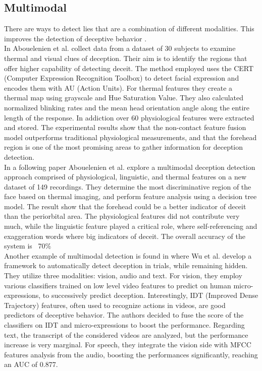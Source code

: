 \documentclass[LaM,binding=0.6cm,english,noexaminfo]{sapthesis}
\begin{document}
\subsection*{Multimodal}
There are ways to detect lies that are a combination of different modalities. This improves the detection of deceptive behavior \cite{Abouelenien:2014:DDU:2663204.2663229}. \\
In \cite{Abouelenien:2016:ATV:2910674.2910682} Abouelenien et al. collect data from a dataset of 30 subjects to examine thermal and visual clues of deception. Their aim is to identify the regions that offer higher capability of detecting deceit. The method employed uses the CERT (Computer Expression Recognition Toolbox) to detect facial expression and encodes them with AU (Action Units). For thermal features they create a thermal map using grayscale and Hue Saturation Value. They also calculated normalized blinking rates and the mean head orientation angle along the entire length of the response. In addiction over 60 physiological features were extracted and stored. The experimental results show that the non-contact feature fusion model outperforms traditional physiological measurements, and that the forehead region is one of the most promising areas to gather information for deception detection.\\
In a following paper \cite{7782429} Abouelenien et al. explore a multimodal deception detection approach comprised of physiological, linguistic, and thermal features on a new dataset of 149 recordings. They determine the most discriminative region of the face based on thermal imaging, and perform feature analysis using a decision tree model. The result show that the forehead could be a better indicator of deceit than the periorbital area. The physiological features did not contribute very much, while the linguistic feature played a critical role, where self-referencing and exaggeration words where big indicators of deceit. The overall accuracy of the system is ~70\%\\
Another example of multimodal detection is found in \cite{DBLP:journals/corr/abs-1712-04415} where Wu et al. develop a framework to automatically detect deception in trials, while remaining hidden. They utilize three modalities: vision, audio and text. For vision, they employ various classifiers trained on low level video features to predict on human micro-expressions, to successively predict deception. Interestingly, IDT (Improved Dense Trajectory) features, often used to recognize actions in videos, are good predictors of deceptive behavior. The authors decided to fuse the score of the classifiers on IDT and micro-expressions to boost the performance. Regarding text, the transcript of the considered videos are analyzed, but the performance increase is very marginal. For speech, they integrate the vision side with MFCC features analysis from the audio, boosting the performances significantly, reaching an AUC of 0.877. \\
\end{document}

